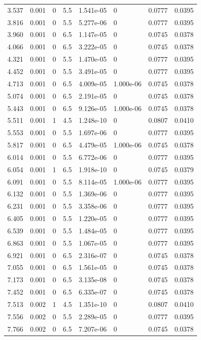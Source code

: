 \documentclass[preview]{standalone}
\begin{document}
{{\begin{tabular}{L{1.2cm}C{1.2cm} C{0.3cm}C{0.5cm} C{1.4cm}C{1.4cm} C{1.4cm}C{1.4cm}}
  3.537  &  0.001  & 0     & 5.5 &  1.541e-05  & 0  & 0.0777 &  0.0395   \\ 
  3.816  &  0.001  & 0     & 5.5 &  5.277e-06  & 0  & 0.0777 &  0.0395   \\ 
  3.960  &  0.001  & 0     & 6.5 &  1.147e-05  & 0  & 0.0745 &  0.0378   \\ 
  4.066  &  0.001  & 0     & 6.5 &  3.222e-05  & 0  & 0.0745 &  0.0378   \\ 
  4.321  &  0.001  & 0     & 5.5 &  1.470e-05  & 0  & 0.0777 &  0.0395   \\ 
  4.452  &  0.001  & 0     & 5.5 &  3.491e-05  & 0  & 0.0777 &  0.0395   \\ 
  4.713  &  0.001  & 0     & 6.5 &  4.009e-05  & 1.000e-06  & 0.0745 &  0.0378   \\ 
  5.074  &  0.001  & 0     & 6.5 &  2.191e-05  & 0  & 0.0745 &  0.0378   \\ 
  5.443  &  0.001  & 0     & 6.5 &  9.126e-05  & 1.000e-06  & 0.0745 &  0.0378   \\ 
  5.511  &  0.001  & 1     & 4.5 &  1.248e-10  & 0  & 0.0807 &  0.0410   \\ 
  5.553  &  0.001  & 0     & 5.5 &  1.697e-06  & 0  & 0.0777 &  0.0395   \\ 
  5.817  &  0.001  & 0     & 6.5 &  4.479e-05  & 1.000e-06  & 0.0745 &  0.0378   \\ 
  6.014  &  0.001  & 0     & 5.5 &  6.772e-06  & 0  & 0.0777 &  0.0395   \\ 
  6.054  &  0.001  & 1     & 6.5 &  1.918e-10  & 0  & 0.0745 &  0.0379   \\ 
  6.091  &  0.001  & 0     & 5.5 &  8.114e-05  & 1.000e-06  & 0.0777 &  0.0395   \\ 
  6.132  &  0.001  & 0     & 5.5 &  1.369e-06  & 0  & 0.0777 &  0.0395   \\ 
  6.231  &  0.001  & 0     & 5.5 &  3.358e-06  & 0  & 0.0777 &  0.0395   \\ 
  6.405  &  0.001  & 0     & 5.5 &  1.220e-05  & 0  & 0.0777 &  0.0395   \\ 
  6.539  &  0.001  & 0     & 5.5 &  1.484e-05  & 0  & 0.0777 &  0.0395   \\ 
  6.863  &  0.001  & 0     & 5.5 &  1.067e-05  & 0  & 0.0777 &  0.0395   \\ 
  6.921  &  0.001  & 0     & 6.5 &  2.316e-07  & 0  & 0.0745 &  0.0378   \\ 
  7.055  &  0.001  & 0     & 6.5 &  1.561e-05  & 0  & 0.0745 &  0.0378   \\ 
  7.173  &  0.001  & 0     & 6.5 &  3.135e-08  & 0  & 0.0745 &  0.0378   \\ 
  7.452  &  0.001  & 0     & 6.5 &  6.335e-07  & 0  & 0.0745 &  0.0378   \\ 
  7.513  &  0.002  & 1     & 4.5 &  1.351e-10  & 0  & 0.0807 &  0.0410   \\ 
  7.556  &  0.002  & 0     & 5.5 &  2.289e-05  & 0  & 0.0777 &  0.0395   \\ 
  7.766  &  0.002  & 0     & 6.5 &  7.207e-06  & 0  & 0.0745 &  0.0378   \\ 
\hline 
\end{tabular} 

}}
\end{document}
